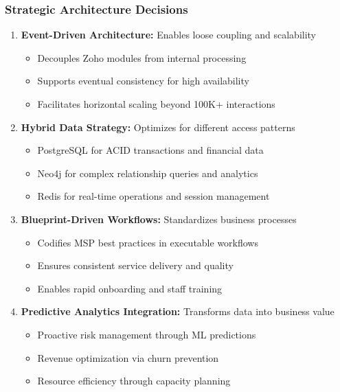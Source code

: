 \subsubsection{Strategic Architecture Decisions}
\begin{enumerate}
\item \textbf{Event-Driven Architecture:} Enables loose coupling and scalability
  \begin{itemize}
    \item Decouples Zoho modules from internal processing
    \item Supports eventual consistency for high availability
    \item Facilitates horizontal scaling beyond 100K+ interactions
  \end{itemize}

\item \textbf{Hybrid Data Strategy:} Optimizes for different access patterns
  \begin{itemize}
    \item PostgreSQL for ACID transactions and financial data
    \item Neo4j for complex relationship queries and analytics
    \item Redis for real-time operations and session management
  \end{itemize}

\item \textbf{Blueprint-Driven Workflows:} Standardizes business processes
  \begin{itemize}
    \item Codifies MSP best practices in executable workflows
    \item Ensures consistent service delivery and quality
    \item Enables rapid onboarding and staff training
  \end{itemize}

\item \textbf{Predictive Analytics Integration:} Transforms data into business value
  \begin{itemize}
    \item Proactive risk management through ML predictions
    \item Revenue optimization via churn prevention
    \item Resource efficiency through capacity planning
  \end{itemize}
\end{enumerate}

